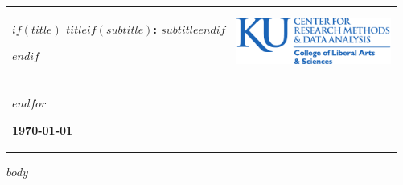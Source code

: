 \documentclass[$if(fontsize)$$fontsize$$endif$,english,letterpaper]{scrartcl}
\providecommand{\tabularnewline}{\\}
\begin{document}
\begin{minipage}[t]{1\columnwidth}%
\begin{center}
\begin{tabular}[t]{>{\raggedright}p{4in}>{\centering}p{2.25in}}
\hline 
\medskip{}
$if(title)$
\textsc{\Large{}$title$$if(subtitle)$: $subtitle$$endif$}{\Large \par}
$endif$

\medskip{}  & \medskip{} \includegraphics[width=2in]{theme/CRMDA_logo}\tabularnewline
\hline

\multicolumn{2}{>{\raggedright}p{6in}}{\medskip{}
$for(author)$$author.name$ $if(author.description)$,
              $author.description$$endif$$if(author.affiliation)$, $author.affiliation$$endif$$if(author.email)$ <$author.email$>$endif$\\
$endfor$


\begin{singlespace}
\raggedright{}\textbf{\today}
\end{singlespace}
}\tabularnewline
\hline 
\end{tabular}
\par\end{center}
\medskip{}

\end{minipage}

$body$
\end{document}

